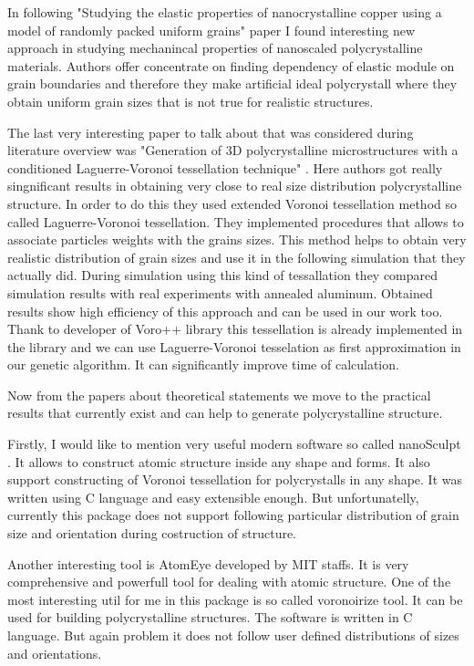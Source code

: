 \documentclass{article}
\begin{document}
In following "Studying the elastic properties of nanocrystalline copper using a model of randomly packed uniform grains" \cite{guo13} paper I found interesting new approach in studying mechanincal properties of nanoscaled polycrystalline materials. Authors offer concentrate on finding dependency of elastic module on grain boundaries and therefore they make artificial ideal polycrystall where they obtain uniform grain sizes that is not true for realistic structures.

The last very interesting paper to talk about that was considered during literature overview was "Generation of 3D polycrystalline microstructures with a conditioned Laguerre-Voronoi tessellation technique" \cite{falco13}.
Here authors got really singnificant results in obtaining very close to real size distribution polycrystalline structure. In order to do this they used extended Voronoi tessellation method so called Laguerre-Voronoi tessellation. They implemented procedures that allows to associate particles weights with the grains sizes. This method helps to obtain very realistic distribution of grain sizes and use it in the following simulation that they actually did. During simulation using this kind of tessallation they compared simulation results with real experiments with annealed aluminum. Obtained results show high efficiency of this approach and can be used in our work too. Thank to developer of Voro++ library this tessellation is already implemented in the library and we can use Laguerre-Voronoi tesselation as first approximation in our genetic algorithm. It can significantly improve time of calculation.

Now from the papers about theoretical statements we move to the practical results that currently exist and can help to generate polycrystalline structure.

Firstly, I would like to mention very useful modern software so called nanoSculpt \cite{prak16}. It allows to construct atomic structure inside any shape and forms. It also support constructing of Voronoi tessellation for polycrystalls in any shape. It was written using C language and easy extensible enough. But unfortunatelly, currently this package does not support following particular distribution of grain size and orientation during costruction of structure. 

Another interesting tool is AtomEye \cite{juli03} developed by MIT staffs. It is very comprehensive and powerfull tool for dealing with atomic structure. One of the most interesting util for me in this package is so called voronoirize tool. It can be used for building polycrystalline structures. The software is written in C language. But again problem it does not follow user defined distributions of sizes and orientations. 
\end{document}
